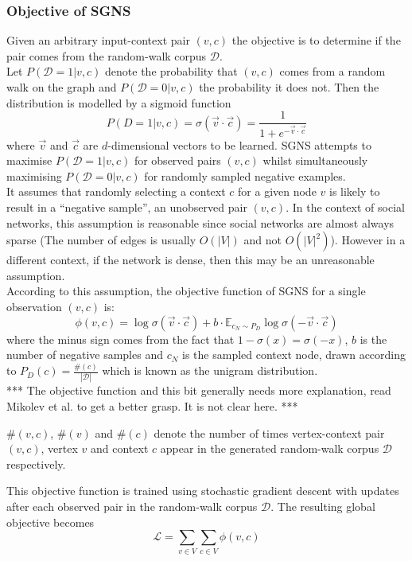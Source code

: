 \documentclass[a4paper]{article}
\renewcommand{\E}{\mathbb E}
\newcommand{\D}{\mathcal D}
\begin{document}
\subsubsection{Objective of SGNS}
Given an arbitrary input-context pair $(v,c)$ the objective is to determine if
the pair comes from the random-walk corpus $\mathcal{D}$.\\
Let $P(\D = 1 | v, c)$ denote the probability that $(v,c)$ comes from a random
walk on the graph and $P(\D = 0| v, c)$
the probability it does not. Then the distribution is modelled by a sigmoid
function
\[P(D = 1 | v, c) = \sigma(\vec{v} \cdot \vec{c}) = \frac{1}{1 + e^{-\vec{v} \cdot \vec{c}}}\]
where $\vec{v}$ and $\vec{c}$ are $d$-dimensional vectors to be learned. SGNS attempts to maximise $P(\mathcal{D} = 1 | v,c)$ for observed pairs $(v, c)$
whilst simultaneously maximising $P(\D = 0 | v, c)$ for randomly sampled
negative examples.\\
It assumes that randomly selecting a context $c$ for a given
node $v$ is likely to result in a ``negative sample'', an unobserved pair $(v,c)$. In the context of
social networks, this assumption is reasonable since social networks are almost
always sparse (The number of edges is usually $O(|V|)$ and not $O(|V|^2)$). However in a different
context, if the network is dense, then this may be an unreasonable assumption.\\
According to this assumption, the objective function of SGNS for a single
observation $(v,c)$ is:
\[\phi(v, c) = \log{\sigma(\vec{v} \cdot \vec{c})} + b \cdot \E_{c_{N} \sim P_D}\log{\sigma(-\vec{v} \cdot \vec{c})}\]
where the minus sign comes from the fact that $1 - \sigma(x) = \sigma(-x)$, $b$
is the number of negative samples and $c_N$ is the sampled context node, drawn
according to $P_D (c) = \frac{\#(c)}{| \D |}$ which is known as the unigram
distribution.\\

*** The objective function and this bit generally needs more explanation, read
Mikolev et al. to get a better grasp. It is not clear here. ***
\begin{notation} $\#(v,c)$, $\#(v)$ and $\#(c)$ denote the number of times vertex-context pair
  $(v,c)$, vertex $v$ and context $c$ appear in the generated random-walk corpus
  $\mathcal{D}$ respectively.
\end{notation}
This objective function is trained using stochastic gradient descent with
updates after each  observed pair in the random-walk corpus $\D$. The resulting
global objective becomes
\begin{equation}
  \mathcal{L} = \sum_{v \in V} \sum_{c \in V} \phi(v, c)
\end{equation}
\end{document}
